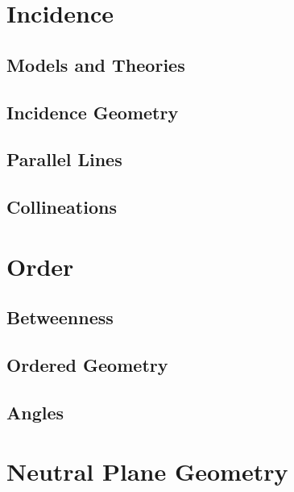\documentclass{memoir}
\begin{document}
\mainmatter

\chapter{Incidence}
\newpage

  \section{Models and Theories}
    
    \newpage

  \section{Incidence Geometry}
    
    \newpage

  \section{Parallel Lines}
    
    \newpage

  \section{Collineations}
    


\chapter{Order}
\newpage

  \section{Betweenness}
    
    \newpage

  \section{Ordered Geometry}
    
    \newpage

  \section{Angles}
    


\chapter{Neutral Plane Geometry}
\newpage
\end{document}
